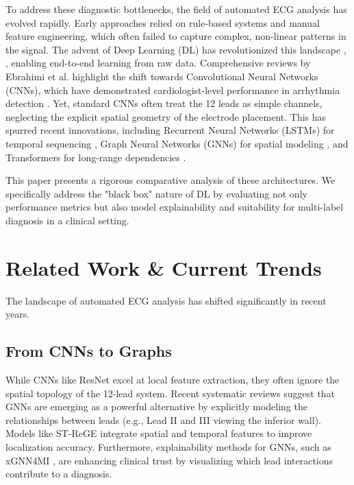 \documentclass[conference]{IEEEtran}
\begin{document}
To address these diagnostic bottlenecks, the field of automated ECG analysis has evolved rapidly. Early approaches relied on rule-based systems and manual feature engineering, which often failed to capture complex, non-linear patterns in the signal. The advent of Deep Learning (DL) has revolutionized this landscape \cite{ribeiro2020automatic}, \cite{hannun2019cardiologist}, enabling end-to-end learning from raw data. Comprehensive reviews by Ebrahimi et al. \cite{ebrahimi2020review} highlight the shift towards Convolutional Neural Networks (CNNs), which have demonstrated cardiologist-level performance in arrhythmia detection \cite{hannun2019cardiologist}. Yet, standard CNNs often treat the 12 leads as simple channels, neglecting the explicit spatial geometry of the electrode placement. This has spurred recent innovations, including Recurrent Neural Networks (LSTMs) for temporal sequencing \cite{deep2024classification}, Graph Neural Networks (GNNs) for spatial modeling \cite{zhang2023strege}, and Transformers for long-range dependencies \cite{vaswani2017attention}.

This paper presents a rigorous comparative analysis of these architectures. We specifically address the "black box" nature of DL by evaluating not only performance metrics but also model explainability and suitability for multi-label diagnosis in a clinical setting.

\section{Related Work \& Current Trends}
The landscape of automated ECG analysis has shifted significantly in recent years.

\subsection{From CNNs to Graphs}
While CNNs like ResNet \cite{he2016deep} excel at local feature extraction, they often ignore the spatial topology of the 12-lead system. Recent systematic reviews \cite{muller2026application} suggest that GNNs are emerging as a powerful alternative by explicitly modeling the relationships between leads (e.g., Lead II and III viewing the inferior wall). Models like ST-ReGE \cite{zhang2023strege} integrate spatial and temporal features to improve localization accuracy. Furthermore, explainability methods for GNNs, such as xGNN4MI \cite{maurer2025xgnn}, are enhancing clinical trust by visualizing which lead interactions contribute to a diagnosis.
\end{document}
